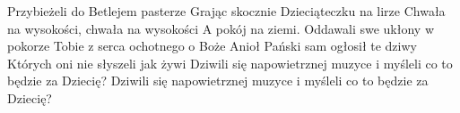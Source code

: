 \beginverse
Przybieżeli do Betlejem pasterze
Grając skocznie Dzieciąteczku na lirze
\endverse
\beginchorus
Chwała na wysokości, chwała na wysokości
A pokój na ziemi.
\endchorus
\beginverse
Oddawali swe ukłony w pokorze
Tobie z serca ochotnego o Boże
\endverse
\beginverse
Anioł Pański sam ogłosił te dziwy
Których oni nie słyszeli jak żywi
\endverse
\beginverse
Dziwili się napowietrznej muzyce
i myśleli co to będzie za Dziecię?
\endverse
\beginverse
Dziwili się napowietrznej muzyce
i myśleli co to będzie za Dziecię?
\endverse
\endsong